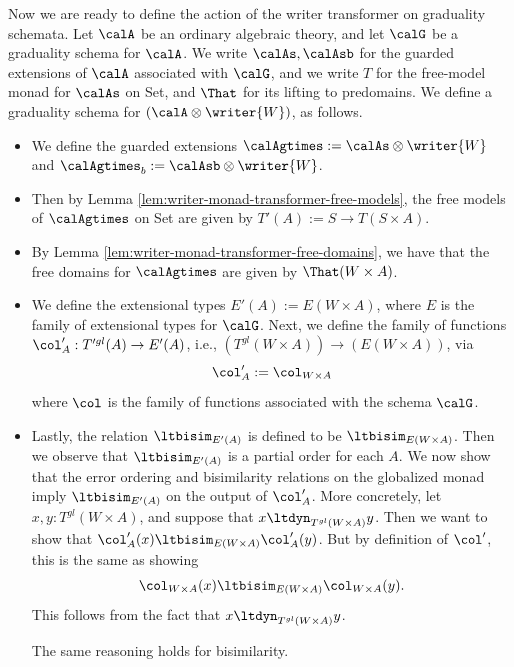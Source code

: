Now we are ready to define the action of the writer transformer on
graduality schemata. Let $\calA$ be an ordinary algebraic theory, and let
$\calG$ be a graduality schema for $\calA$.
%
We write $\calAs, \calAsb$ for the guarded extensions of $\calA$ associated with
$\calG$, and we write $T$ for the free-model monad for $\calAs$ on Set, and
$\That$ for its lifting to predomains.
%
We define a graduality schema for $(\calA \otimes \writer{W})$, as follows.
\begin{itemize}
    \item We define the guarded extensions 
    $\calAgtimes := \calAs \otimes \writer{W}$ and 
    $\calAgtimes_b := \calAsb \otimes \writer{W}$.

    \item Then by Lemma \ref{lem:writer-monad-transformer-free-models}, the free models of
    $\calAgtimes$ on Set are given by $T'(A) := S \to T(S \times A)$.

    \item By Lemma \ref{lem:writer-monad-transformer-free-domains}, we have that 
    the free domains for $\calAgtimes$ are given by $\That(W \times A)$.

    \item We define the extensional types $E'(A) := E(W \times A)$, where
    $E$ is the family of extensional types for $\calG$. Next, we define the
    family of functions
    $\col'_A : T'^{gl}(A) \to E'(A)$, i.e., $(T^{gl}(W \times A)) \to (E(W \times A))$, via 
    \[ \col'_A := \col_{W \times A} \]
    where $\col$ is the family of functions associated with the schema $\calG$.

    \item Lastly, the relation $\ltbisim_{E'(A)}$ is defined to be $\ltbisim_{E(W \times A)}$.
    Then we observe that $\ltbisim_{E'(A)}$ is a partial order for each $A$. We
    now show that the error ordering and bisimilarity relations on the
    globalized monad imply $\ltbisim_{E'(A)}$ on the output of $\col'_A$.
    More concretely, let $x, y : T^{gl}(W \times A)$, and suppose that 
    $x \ltdyn_{T^{gl}(W \times A)} y$. Then we want to show that
    $\col'_A(x) \ltbisim_{E(W \times A)} \col'_A(y)$.
    But by definition of $\col'$, this is the same as showing
    \[ \col_{W \times A}(x) \ltbisim_{E(W \times A)} \col_{W \times A}(y). \] 
    This follows from the fact that $x \ltdyn_{T^{gl}(W \times A)} y$.

    The same reasoning holds for bisimilarity.
\end{itemize}



